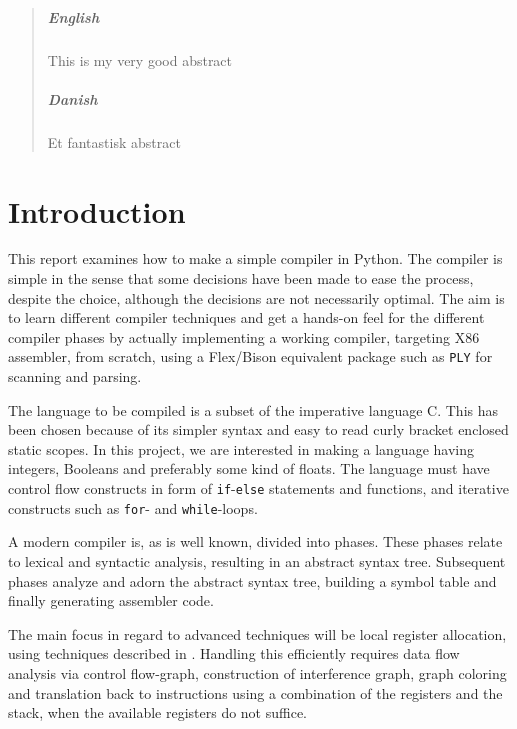 
\begin{abstract}
    \paragraph{English}
    This is my very good abstract

    \paragraph{Danish}
    Et fantastisk abstract
\end{abstract}

{ \hypersetup{hidelinks} \tableofcontents }

\newpage
{}
\setcounter{page}{1}

\chapter{Introduction}
This report examines how to make a simple compiler in Python. The compiler is simple in the sense that some decisions have been made to ease the process, despite the choice, although the decisions are not necessarily optimal. The aim is to learn different compiler techniques and get a hands-on feel for the different compiler phases by actually implementing a working compiler, targeting X86 assembler, from scratch, using a Flex/Bison equivalent package such as \texttt{PLY} for scanning and parsing. 

The language to be compiled is a subset of the imperative language C. This has been chosen because of its simpler syntax and easy to read curly bracket enclosed static scopes. In this project, we are interested in making a language having integers, Booleans and preferably some kind of floats. The language must have control flow constructs in form of \texttt{if}-\texttt{else} statements and functions, and iterative constructs such as \texttt{for}- and \texttt{while}-loops. 

A modern compiler is, as is well known, divided into phases. These phases relate to lexical and syntactic analysis, resulting in an abstract syntax tree. Subsequent phases analyze and adorn the abstract syntax tree, building a symbol table and finally generating assembler code.

The main focus in regard to advanced techniques will be local register allocation, using techniques described in \cite{EnginneringACompiler}. Handling this efficiently requires data flow analysis via control flow-graph, construction of interference graph, graph coloring and translation back to instructions using a combination of the registers and the stack, when the available registers do not suffice.

